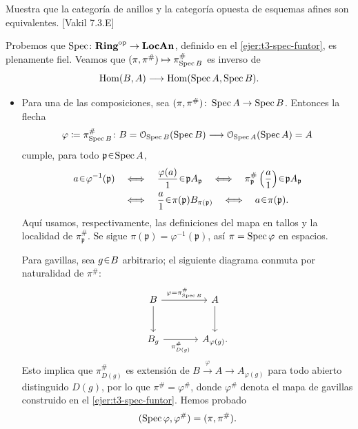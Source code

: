 \begin{ejer}\label{ejer:t3-equivalencia-afines}
Muestra que la categoría de anillos y la categoría opuesta de esquemas afines son equivalentes. \hfill [Vakil 7.3.E]
\end{ejer}
\begin{sol}
Probemos que $\operatorname{Spec}\colon\mathbf{Ring}^{\mathrm{op}}\to\mathbf{LocAn}$, definido en el \cref{ejer:t3-spec-funtor}, es plenamente fiel. Veamos que $(\pi,\pi^\#)\mapsto\pi^\#_{\operatorname{Spec} B}$ es inverso de
\[
\operatorname{Hom}(B,A)\longrightarrow\operatorname{Hom}(\operatorname{Spec} A,\operatorname{Spec} B).
\]
\begin{itemize}
\item Para una de las composiciones, sea $(\pi,\pi^\#)\colon\operatorname{Spec} A\to\operatorname{Spec} B$. Entonces la flecha
\[
\varphi\coloneq\pi^\#_{\operatorname{Spec} B}\colon
B=\mathcal O_{\operatorname{Spec} B}(\operatorname{Spec} B)\longrightarrow\mathcal O_{\operatorname{Spec} A}(\operatorname{Spec} A)=A
\]
cumple, para todo $\mathfrak p\en\Spec A$,
\[
\begin{aligned}
a\en\varphi^{-1}(\mathfrak p)
&\quad\Longleftrightarrow\quad\frac{\varphi(a)}{1}\en\mathfrak p A_{\mathfrak p}
\quad\Longleftrightarrow\quad\pi^\#_{\mathfrak p}\left(\frac{a}{1}\right)\en\mathfrak p A_{\mathfrak p}\\
&\quad\Longleftrightarrow\quad\frac{a}{1}\en\pi(\mathfrak p)B_{\pi(\mathfrak p)}
\quad\Longleftrightarrow\quad a\en\pi(\mathfrak p).
\end{aligned}
\]
Aquí usamos, respectivamente, las definiciones del mapa en tallos y la localidad de $\pi^\#_{\mathfrak p}$. Se sigue $\pi(\mathfrak p)=\varphi^{-1}(\mathfrak p)$, así $\pi=\operatorname{Spec}\varphi$ en espacios.

Para gavillas, sea $g\en B$ arbitrario; el siguiente diagrama conmuta por naturalidad de $\pi^\#$:
\[
\begin{tikzcd}[column sep=large,row sep=large]
B\arrow[r,"{\varphi=\pi^\#_{\Spec B}}"]\arrow[d]&A\arrow[d]\\
B_g\arrow[r,"\pi^\#_{D(g)}"']&A_{\varphi(g)}.
\end{tikzcd}
\]
Esto implica que $\pi^\#_{D(g)}$ es extensión de $B\xrightarrow{\varphi}A\to A_{\varphi(g)}$ para todo abierto distinguido $D(g)$, por lo que $\pi^\#=\varphi^\#$, donde $\varphi^\#$ denota el mapa de gavillas construido en el \cref{ejer:t3-spec-funtor}. Hemos probado
\[
(\operatorname{Spec}\varphi,\varphi^\#)=(\pi,\pi^\#).
\]


\end{itemize}
\end{sol}
